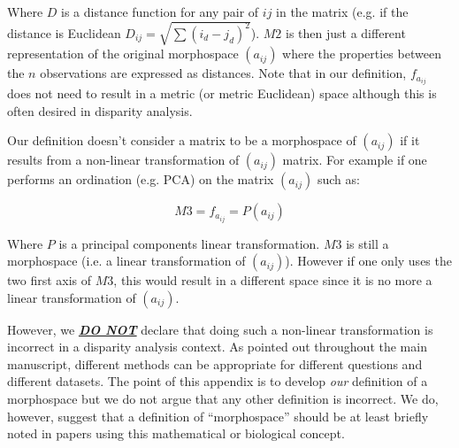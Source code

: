\documentclass[12pt,letterpaper]{article}
\begin{document}
\noindent Where $D$ is a distance function for any pair of $ij$ in the matrix (e.g. if the distance is Euclidean $D_{ij} = \sqrt{\sum(i_{d}-j_{d})^2}$).
$M2$ is then just a different representation of the original morphospace $(a_{ij})$ where the properties between the $n$ observations are expressed as distances.
Note that in our definition, $f_{a_{ij}}$ does not need to result in a metric (or metric Euclidean) space although this is often desired in disparity analysis.

Our definition doesn't consider a matrix to be a morphospace of $(a_{ij})$ if it results from a non-linear transformation of $(a_{ij})$ matrix.
For example if one performs an ordination (e.g. PCA) on the matrix $(a_{ij})$ such as:

\begin{equation}
    M3 = f_{a_{ij}} = P(a_{ij})
\end{equation}

\noindent Where $P$ is a principal components linear transformation.
$M3$ is still a morphospace (i.e. a linear transformation of $(a_{ij})$). However if one only uses the two first axis of $M3$, this would result in a different space since it is no more a linear transformation of $(a_{ij})$.

However, we \textbf{\underline{\textit{DO NOT}}} declare that doing such a non-linear transformation is incorrect in a disparity analysis context.
As pointed out throughout the main manuscript, different methods can be appropriate for different questions and different datasets.
The point of this appendix is to develop \textit{our} definition of a morphospace but we do not argue that any other definition is incorrect.
We do, however, suggest that a definition of ``morphospace'' should be at least briefly noted in papers using this mathematical or biological concept.




\end{document}
